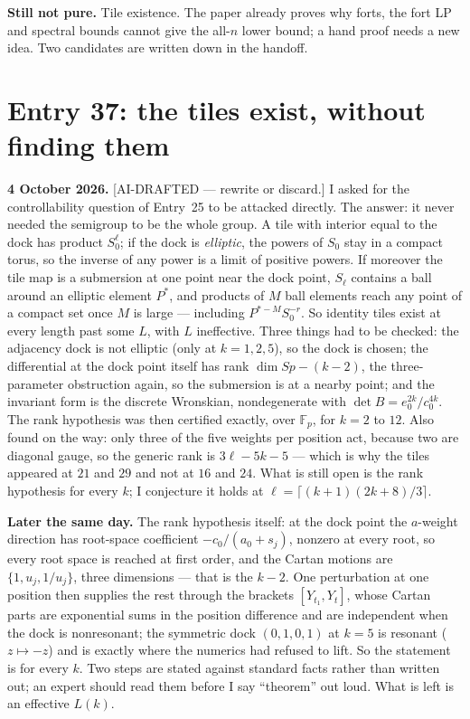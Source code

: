 \documentclass[12pt]{article}
\begin{document}
\textbf{Still not pure.} Tile existence. The paper already proves why forts,
the fort LP and spectral bounds cannot give the all-$n$ lower bound; a hand
proof needs a new idea. Two candidates are written down in the handoff.


\section*{Entry 37: the tiles exist, without finding them}

\textbf{4 October 2026.} [AI-DRAFTED --- rewrite or discard.] I asked for the
controllability question of Entry~25 to be attacked directly. The answer: it
never needed the semigroup to be the whole group. A tile with interior equal to
the dock has product $S_0^{\ell}$; if the dock is \emph{elliptic}, the powers of
$S_0$ stay in a compact torus, so the inverse of any power is a limit of positive
powers. If moreover the tile map is a submersion at one point near the dock
point, $S_\ell$ contains a ball around an elliptic element $P^*$, and products
of $M$ ball elements reach any point of a compact set once $M$ is large ---
including $P^{*-M}S_0^{-r}$. So identity tiles exist at every length past some
$L$, with $L$ ineffective. Three things had to be checked: the adjacency dock is
not elliptic (only at $k=1,2,5$), so the dock is chosen; the differential at
the dock point itself has rank $\dim Sp-(k-2)$, the three-parameter obstruction
again, so the submersion is at a nearby point; and the invariant form is the
discrete Wronskian, nondegenerate with $\det B=e_0^{2k}/c_0^{4k}$. The rank
hypothesis was then certified exactly, over $\mathbb F_p$, for $k=2$ to $12$.
Also found on the way: only three of the five weights per position act, because
two are diagonal gauge, so the generic rank is $3\ell-5k-5$ --- which is why the
tiles appeared at $21$ and $29$ and not at $16$ and $24$. What is still open is
the rank hypothesis for every $k$; I conjecture it holds at
$\ell=\lceil(k+1)(2k+8)/3\rceil$.


\textbf{Later the same day.} The rank hypothesis itself: at the dock point the
$a$-weight direction has root-space coefficient $-c_0/(a_0+s_j)$, nonzero at
every root, so every root space is reached at first order, and the Cartan
motions are $\{1,u_j,1/u_j\}$, three dimensions --- that is the $k-2$. One
perturbation at one position then supplies the rest through the brackets
$[Y_{t_1},Y_t]$, whose Cartan parts are exponential sums in the position
difference and are independent when the dock is nonresonant; the symmetric dock
$(0,1,0,1)$ at $k=5$ is resonant ($z\mapsto-z$) and is exactly where the
numerics had refused to lift. So the statement is for every $k$. Two steps are
stated against standard facts rather than written out; an expert should read
them before I say ``theorem'' out loud. What is left is an effective $L(k)$.
\end{document}
